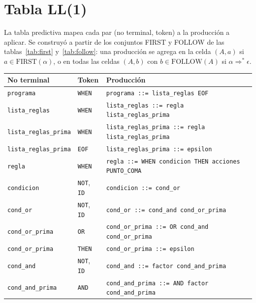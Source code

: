 \documentclass[12pt,a4paper]{article}
\begin{document}
\section{Tabla LL(1)}
\label{sec:tabla-ll1}

La tabla predictiva mapea cada par (no terminal, token) a la producción a
aplicar. Se construyó a partir de los conjuntos FIRST y FOLLOW de las
tablas~\ref{tab:first} y~\ref{tab:follow}: una producción se agrega en la
celda $(A, a)$ si $a \in \text{FIRST}(\alpha)$, o en todas las celdas
$(A, b)$ con $b \in \text{FOLLOW}(A)$ si $\alpha \Rightarrow^* \epsilon$.

\begin{table}[h!]
\centering
\begin{tabular}{lll}
\toprule
\textbf{No terminal} & \textbf{Token} & \textbf{Producción} \\
\midrule
\texttt{programa}            & \texttt{WHEN}         & \texttt{programa ::= lista\_reglas EOF} \\
\texttt{lista\_reglas}       & \texttt{WHEN}         & \texttt{lista\_reglas ::= regla lista\_reglas\_prima} \\
\texttt{lista\_reglas\_prima}& \texttt{WHEN}         & \texttt{lista\_reglas\_prima ::= regla lista\_reglas\_prima} \\
\texttt{lista\_reglas\_prima}& \texttt{EOF}          & \texttt{lista\_reglas\_prima ::= epsilon} \\
\texttt{regla}               & \texttt{WHEN}         & \texttt{regla ::= WHEN condicion THEN acciones PUNTO\_COMA} \\
\texttt{condicion}           & \texttt{NOT}, \texttt{ID} & \texttt{condicion ::= cond\_or} \\
\texttt{cond\_or}            & \texttt{NOT}, \texttt{ID} & \texttt{cond\_or ::= cond\_and cond\_or\_prima} \\
\texttt{cond\_or\_prima}     & \texttt{OR}           & \texttt{cond\_or\_prima ::= OR cond\_and cond\_or\_prima} \\
\texttt{cond\_or\_prima}     & \texttt{THEN}         & \texttt{cond\_or\_prima ::= epsilon} \\
\texttt{cond\_and}           & \texttt{NOT}, \texttt{ID} & \texttt{cond\_and ::= factor cond\_and\_prima} \\
\texttt{cond\_and\_prima}    & \texttt{AND}          & \texttt{cond\_and\_prima ::= AND factor cond\_and\_prima} \\

\end{tabular}
\end{table}
\end{document}
